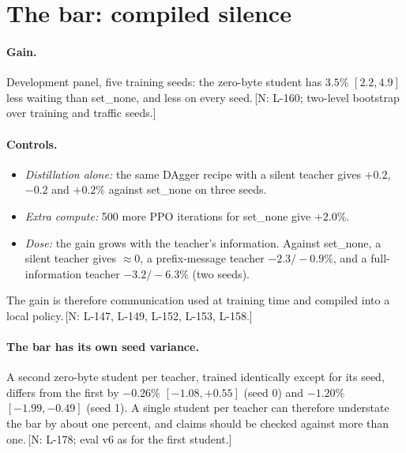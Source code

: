 \documentclass[11pt]{article}
\theoremstyle{definition}
\newif\ifshownotes\shownotestrue
\newcommand{\NOTE}[1]{\ifshownotes{\color{notecol}\,\textsf{\footnotesize[N: #1]}}\fi}
\begin{document}
\section{The bar: compiled silence}\label{sec:student}
\paragraph{Gain.} Development panel, five training seeds: the zero-byte student has $3.5\%$ $[2.2,4.9]$ less waiting than
set\_none, and less on every seed.\NOTE{L-160; two-level bootstrap over training and traffic seeds.}
\paragraph{Controls.}
\begin{itemize}
\item \emph{Distillation alone:} the same DAgger recipe with a silent teacher gives $+0.2$, $-0.2$ and $+0.2\%$ against
set\_none on three seeds.
\item \emph{Extra compute:} 500 more PPO iterations for set\_none give $+2.0\%$.
\item \emph{Dose:} the gain grows with the teacher's information. Against set\_none, a silent teacher gives $\approx0$, a
prefix-message teacher $-2.3/-0.9\%$, and a full-information teacher $-3.2/-6.3\%$ (two seeds).
\end{itemize}
The gain is therefore communication used at training time and compiled into a local policy.\NOTE{L-147, L-149, L-152,
L-153, L-158.}
\paragraph{The bar has its own seed variance.} A second zero-byte student per teacher, trained identically except for its
seed, differs from the first by $-0.26\%$ $[-1.08,+0.55]$ (seed 0) and $-1.20\%$ $[-1.99,-0.49]$ (seed 1). A single
student per teacher can therefore understate the bar by about one percent, and claims should be checked against more
than one.\NOTE{L-178; eval v6 as for the first student.}
\end{document}
